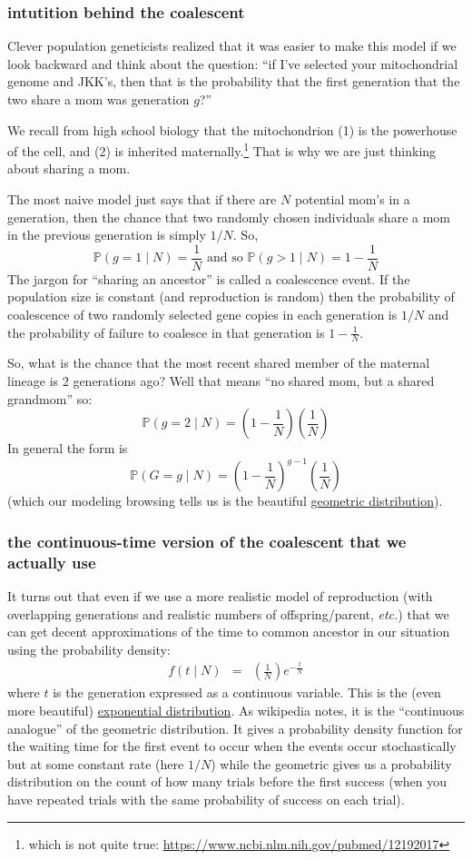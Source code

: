 \documentclass[11pt]{article}
\renewcommand{\Pr}{\mathbb{P}}
\newcommand{\href}[2]{\url{#2}}
\begin{document}
\subsubsection{intutition behind the coalescent}
Clever population geneticists realized that it was easier to make this model if
we look backward and think about the question: ``if I've selected your 
mitochondrial genome and JKK's, then that is the probability that the
first generation that the two share a mom was generation $g$?''

We recall from high school biology that the mitochondrion (1) is the powerhouse of
the cell, and (2) is inherited maternally.\footnote{which is not quite true: \url{https://www.ncbi.nlm.nih.gov/pubmed/12192017}}
That is why we are just thinking about sharing a mom.

The most naive model just says that if there are $N$ potential mom's in a generation,
then the chance that two randomly chosen individuals share a mom in 
the previous generation is simply $1/N$.
So,
$$\Pr(g=1\mid N) = \frac{1}{N} \mbox{ and so } \Pr(g>1\mid N) = 1- \frac{1}{N} $$
The jargon for ``sharing an ancestor'' is called a coalescence event.
If the population size is constant (and reproduction is random) then
the probability of coalescence of two randomly selected gene copies in each generation is $1/N$ and the probability of failure to coalesce in that generation is $1- \frac{1}{N}$.

So, what is the chance that the most recent shared member of the maternal lineage is
2 generations ago?  
Well that means ``no shared mom, but a shared grandmom'' so:
$$\Pr(g=2\mid N) = \left(1 - \frac{1}{N}\right)\left(\frac{1}{N}\right)$$
In general the form is
$$\Pr(G=g\mid N) = \left(1 - \frac{1}{N}\right)^{g-1}\left(\frac{1}{N}\right)$$
(which our modeling browsing tells us is the beautiful 
\href{https://en.wikipedia.org/wiki/Geometric_distribution}{geometric distribution}).

\subsubsection{the continuous-time version  of the coalescent that we actually use}
It turns out that even if we use a more realistic model of reproduction (with overlapping generations and realistic numbers of offspring/parent, {\em etc.})
that we can get decent approximations of the time to common ancestor in 
our situation using the probability density:
\begin{eqnarray}
    f(t\mid N) & = & \left(\frac{1}{N}\right)e^{-\frac{t}{N}}
\end{eqnarray}
where $t$ is the generation expressed as a continuous variable.
This is the (even more beautiful) \href{https://en.wikipedia.org/wiki/Exponential_distribution}{exponential distribution}.
As wikipedia notes, it is the ``continuous analogue'' of the
geometric distribution. 
It gives a probability density function for the waiting time for the first
    event to occur when the events occur stochastically but 
    at some constant rate (here $1/N$)
while the geometric gives us a probability distribution 
    on the count of how many trials before the first success (when 
    you have repeated trials with the same probability of success on each trial).
\end{document}

